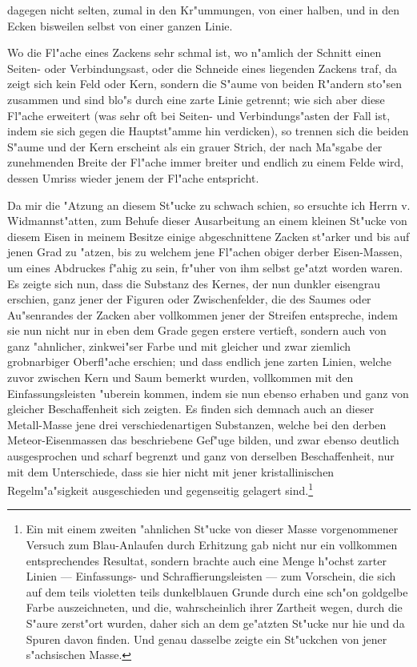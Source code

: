 \documentclass[a4paper, 11pt, oneside, german]{article}
\begin{document}
dagegen nicht selten, zumal in den Kr"ummungen, von einer halben, und in den Ecken bisweilen selbst von einer ganzen Linie.

Wo die Fl"ache eines Zackens sehr schmal ist, wo n"amlich der Schnitt einen Seiten- oder Verbindungsast, oder die Schneide eines liegenden Zackens traf, da zeigt sich kein Feld oder Kern, sondern die S"aume von beiden R"andern sto"sen zusammen und sind blo"s durch eine zarte Linie getrennt; wie sich aber diese Fl"ache erweitert (was sehr oft bei Seiten- und Verbindungs"asten der Fall ist, indem sie sich gegen die Hauptst"amme hin verdicken), so trennen sich die beiden S"aume und der Kern erscheint als ein grauer Strich, der nach Ma"sgabe der zunehmenden Breite der Fl"ache immer breiter und endlich zu einem Felde wird, dessen Umriss wieder jenem der Fl"ache entspricht.

Da mir die "Atzung an diesem St"ucke zu schwach schien, so ersuchte ich Herrn v. Widmannst"atten, zum Behufe dieser Ausarbeitung an einem kleinen St"ucke von diesem Eisen in meinem Besitze einige abgeschnittene Zacken st"arker und bis auf jenen Grad zu "atzen, bis zu welchem jene Fl"achen obiger derber Eisen-Massen, um eines Abdruckes f"ahig zu sein, fr"uher von ihm selbst ge"atzt worden waren. Es zeigte sich nun, dass die Substanz des Kernes, der nun dunkler eisengrau erschien, ganz jener der Figuren oder Zwischenfelder, die des Saumes oder Au"senrandes der Zacken aber vollkommen jener der Streifen entspreche, indem sie nun nicht nur in eben dem Grade gegen erstere vertieft, sondern auch von ganz "ahnlicher, zinkwei"ser Farbe und mit gleicher und zwar ziemlich grobnarbiger Oberfl"ache erschien; und dass endlich jene zarten Linien, welche zuvor zwischen Kern und Saum bemerkt wurden, vollkommen mit den Einfassungsleisten "uberein kommen, indem sie nun ebenso erhaben und ganz von gleicher Beschaffenheit sich zeigten. Es finden sich demnach auch an dieser Metall-Masse jene drei verschiedenartigen Substanzen, welche bei den derben Meteor-Eisenmassen das beschriebene Gef"uge bilden, und zwar ebenso deutlich ausgesprochen und scharf begrenzt und ganz von derselben Beschaffenheit, nur mit dem Unterschiede, dass sie hier nicht mit jener kristallinischen Regelm"a"sigkeit ausgeschieden und gegenseitig gelagert sind.\footnote{Ein mit einem zweiten "ahnlichen St"ucke von dieser Masse vorgenommener Versuch zum Blau-Anlaufen durch Erhitzung gab nicht nur ein vollkommen entsprechendes Resultat, sondern brachte auch eine Menge h"ochst zarter Linien --- Einfassungs- und Schraffierungsleisten --- zum Vorschein, die sich auf dem teils violetten teils dunkelblauen Grunde durch eine sch"on goldgelbe Farbe auszeichneten, und die, wahrscheinlich ihrer Zartheit wegen, durch die S"aure zerst"ort wurden, daher sich an dem ge"atzten St"ucke nur hie und da Spuren davon finden. Und genau dasselbe zeigte ein St"uckchen von jener s"achsischen Masse.}
\end{document}
